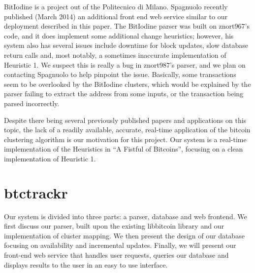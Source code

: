\documentclass[10pt, letterpaper, twocolumn, twoside]{article}
\begin{document}
BitIodine \cite{bitiodine} is a project out of the Politecnico di Milano\cite{bitiodine}. Spagnuolo recently published (March 2014) an additional front end web service similar to our deployment described in this paper. The BitIodine parser was built on znort967's code, and it does implement some additional change heuristics; however, his system also has several issues include downtime for block updates, slow database return calls and, most notably, a sometimes inaccurate implementation of Heuristic 1.  We suspect this is really a bug in znort987's parser, and we plan on contacting Spagnuolo to help pinpoint the issue. Basically, some transactions seem to be overlooked by the BitIodine clusters, which would be explained by the parser failing to extract the address from some inputs, or the transaction being parsed incorrectly.

Despite there being several previously published papers and applications on this topic, the lack of a readily available, accurate, real-time application of the bitcoin clustering algorithm is our motivation for this project. Our system is a real-time implementation of the Heuristics in ``A Fistful of Bitcoins''\cite{fistfull}, focusing on a clean implementation of Heuristic 1. 

\section{btctrackr}
Our system is divided into three parts: a parser, database and web frontend. We first discuss our parser, built upon the existing libbitcoin library and our implementation of cluster mapping. We then present the design of our database focusing on availability and incremental updates. Finally, we will present our front-end web service that handles user requests, queries our database and displays results to the user in an easy to use interface.
\end{document}
